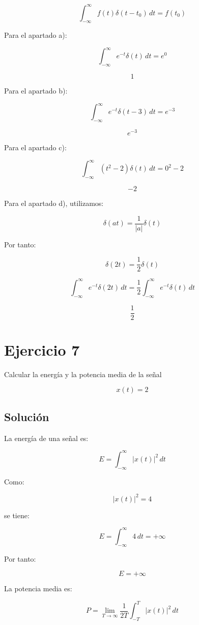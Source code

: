 \documentclass[fleqn]{article}
\begin{document}
	\[
	\int_{-\infty}^{\infty}
	f(t)\delta(t-t_0)\,dt
	=
	f(t_0)
	\]

	Para el apartado a):

	\[
	\int_{-\infty}^{\infty}
	e^{-t}\delta(t)\,dt
	=
	e^0
	\]

	\[
	\boxed{1}
	\]

	Para el apartado b):

	\[
	\int_{-\infty}^{\infty}
	e^{-t}\delta(t-3)\,dt
	=
	e^{-3}
	\]

	\[
	\boxed{e^{-3}}
	\]

	Para el apartado c):

	\[
	\int_{-\infty}^{\infty}
	(t^2-2)\delta(t)\,dt
	=
	0^2-2
	\]

	\[
	\boxed{-2}
	\]

	Para el apartado d), utilizamos:

	\[
	\delta(at)
	=
	\frac{1}{|a|}\delta(t)
	\]

	Por tanto:

	\[
	\delta(2t)
	=
	\frac{1}{2}\delta(t)
	\]

	\[
	\int_{-\infty}^{\infty}
	e^{-t}\delta(2t)\,dt
	=
	\frac{1}{2}
	\int_{-\infty}^{\infty}
	e^{-t}\delta(t)\,dt
	\]

	\[
	\boxed{\frac{1}{2}}
	\]

\section{Ejercicio 7}
	Calcular la energía y la potencia media de la señal

	\[
	x(t)=2
	\]

	\subsection{Solución}

	La energía de una señal es:

	\[
	E
	=
	\int_{-\infty}^{\infty}
	|x(t)|^2\,dt
	\]

	Como:

	\[
	|x(t)|^2=4
	\]

	se tiene:

	\[
	E
	=
	\int_{-\infty}^{\infty}4\,dt
	=
	+\infty
	\]

	Por tanto:

	\[
	\boxed{
	E=+\infty
	}
	\]

	La potencia media es:

	\[
	P
	=
	\lim_{T\to\infty}
	\frac{1}{2T}
	\int_{-T}^{T}
	|x(t)|^2\,dt
	\]
\end{document}
